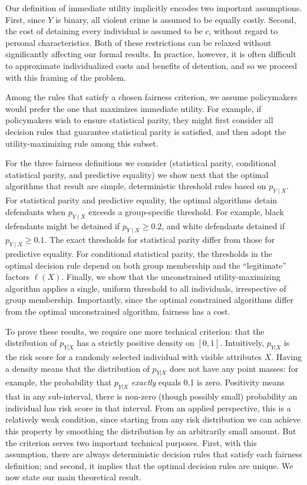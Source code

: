 \documentclass[sigconf]{acmart}
\begin{document}
Our definition of immediate utility implicitly encodes two important assumptions.
First, since $Y$ is binary, all violent crime is assumed to be equally costly.
Second, the cost of detaining every individual is assumed to be $c$, 
without regard to personal characteristics. 
Both of these restrictions can be relaxed without
significantly affecting our formal results.
In practice, however, it is often difficult to approximate 
individualized costs and benefits of detention, and 
so we proceed with this framing of the problem.

Among the rules that satisfy a chosen fairness criterion, 
we assume policymakers would prefer the one that maximizes immediate utility.
For example, if policymakers wish to ensure statistical parity, they might first consider all decision rules that guarantee statistical parity is satisfied, 
and then adopt the utility-maximizing rule among this subset.

For the three fairness definitions we consider (statistical parity, conditional statistical parity, and predictive equality) 
we show next 
that the optimal algorithms that result are simple, deterministic threshold rules based on $p_{Y\mid X}$.
For statistical parity and predictive equality, 
the optimal algorithms detain defendants when $p_{Y\mid X}$ exceeds 
a group-specific threshold.
For example, black defendants might be detained if $p_{Y\mid X} \geq 0.2$,
and white defendants detained if $p_{Y\mid X} \geq 0.1$.
The exact thresholds for statistical parity differ from those for predictive equality.
For conditional statistical parity, the thresholds in the optimal decision rule depend on both
group membership and the ``legitimate'' factors $\ell(X)$. 
Finally, we show that the unconstrained utility-maximizing algorithm 
applies a single, uniform threshold to all individuals, irrespective of group membership.
Importantly, since the optimal constrained algorithms differ from the optimal unconstrained algorithm, fairness has a cost.

To prove these results, we require one more technical criterion: 
that the distribution of $p_{Y|X}$ has a strictly positive density on $[0,1]$.
Intuitively, $p_{Y|X}$ is the risk score for a randomly selected individual with visible attributes $X$. Having a density means that the distribution of $p_{Y|X}$ does not have any point masses: for example, the probability that $p_{Y|X}$ \emph{exactly} equals 0.1 is zero. Positivity means that in any sub-interval, there is non-zero (though possibly small) probability an individual has risk score in that interval.
From an applied perspective, this is a relatively weak condition, since 
starting from any risk distribution 
we can achieve this property by smoothing the distribution 
by an arbitrarily small amount.
But the criterion serves two important technical purposes.
First, with this assumption, there are always deterministic decision rules that satisfy each fairness definition; and
second, it implies that the optimal decision rules are unique.
We now state our main theoretical result.
\end{document}
